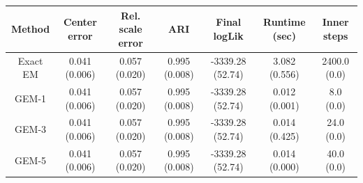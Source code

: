 \begin{tabular}{ccccccc}
\hline
Method & Center error & Rel. scale error & ARI & Final logLik & Runtime (sec) & Inner steps \\
\hline
Exact EM & 0.041 (0.006) & 0.057 (0.020) & 0.995 (0.008) & -3339.28 (52.74) & 3.082 (0.556) &  2400.0 (0.0) \\
GEM-1 & 0.041 (0.006) & 0.057 (0.020) & 0.995 (0.008) & -3339.28 (52.74) & 0.012 (0.001) &  8.0 (0.0) \\
GEM-3 & 0.041 (0.006) & 0.057 (0.020) & 0.995 (0.008) & -3339.28 (52.74) & 0.014 (0.425) &  24.0 (0.0) \\
GEM-5 & 0.041 (0.006) & 0.057 (0.020) & 0.995 (0.008) & -3339.28 (52.74) & 0.014 (0.000) &  40.0 (0.0) \\
\hline
\end{tabular}
